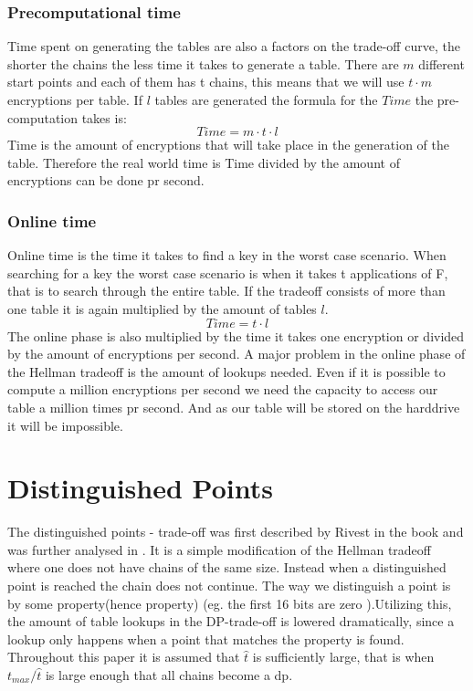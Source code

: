 \subsubsection{Precomputational time}
Time spent on generating the tables are also a factors on the trade-off
curve, the shorter the chains the less time it takes to generate a table. There are $m$ different start points and each of them has t chains, this means that we will use $t\cdot m$ encryptions per table. If $l$ tables are generated the formula for the $Time$ the pre-computation takes is:
\begin{equation}
  Time=m\cdot t\cdot l
\end{equation}
Time is the amount of encryptions that will take place in the generation of the table. Therefore the real world time is Time divided by the amount of encryptions can be done pr second.

\subsubsection{Online time}
Online time is the time it takes to find a key in the worst case scenario. When searching for a key the worst case scenario is when it takes t applications of F, that is to search through the entire table. If the tradeoff consists of more than one table it is again multiplied by the amount of tables $l$.
\begin{equation}
  Time=t\cdot l
\end{equation}
The online phase is also multiplied by the time it takes one encryption or divided by the amount of encryptions per second. A major problem in the online phase of the  Hellman tradeoff is the amount of lookups needed. Even if it is possible to compute a million encryptions per second we need the capacity to access our table a million times pr second. And as our table will be stored on the harddrive it will be impossible.

\section{Distinguished Points}
\label{sec:dptheory}

The distinguished points - trade-off was first described by Rivest in
the book \cite{DP1} and was further analysed in \cite{DP}. It is a simple modification of the Hellman tradeoff
where one does not have chains of the same size. Instead when a
distinguished point is reached the chain does not continue. The way we distinguish a point is by some property(hence property) (eg. the first 16 bits are zero ).Utilizing this, the amount of table lookups in the DP-trade-off is lowered dramatically, since a lookup only happens when a point that matches the property is found. Throughout this paper it is assumed that $\hat{t}$ is sufficiently large, that is when $t_{max}/\hat{t}$ is large enough that all chains become a dp.

